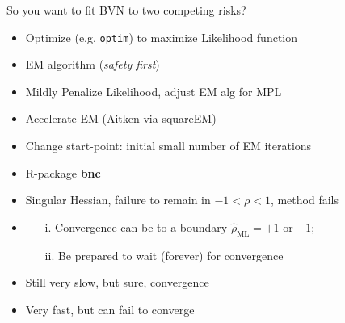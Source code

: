 \documentclass[10pt]{beamer}
\providecommand{\tightlist}{%
\setlength{\itemsep}{0pt}\setlength{\parskip}{0pt}}
\begin{document}
\begin{frame}[fragile]{So you want to fit BVN to two competing risks?}
\protect\hypertarget{so-you-want-to-fit-bvn-to-two-competing-risks}{}
\begin{itemize}
\tightlist
\item<1->
  Optimize (e.g. \texttt{optim}) to maximize Likelihood function
  \item<2-> EM algorithm (\emph{safety first}) 
  \item<3-> Mildly
Penalize Likelihood, adjust EM alg for MPL
  \item<4-> Accelerate EM (Aitken via squareEM)
  \item<5-> Change start-point: initial small number of
EM iterations 
  \item<6-> R-package \textbf{bnc}
\end{itemize}

\begin{itemize}
\item<1> Singular Hessian, failure to remain in $-1 < \rho < 1$, method fails 
\item<2>
  \begin{enumerate}
  \item[i.] Convergence can be to a boundary $\hat{\rho}_{\mbox{ML}} = +1$ or $-1$;
  \item[ii.] Be prepared to wait (forever) for convergence
  \end{enumerate}
\item<3> Still very slow, but sure, convergence
\item<4> Very fast, but can fail to converge
\end{itemize}
\end{frame}
\end{document}
